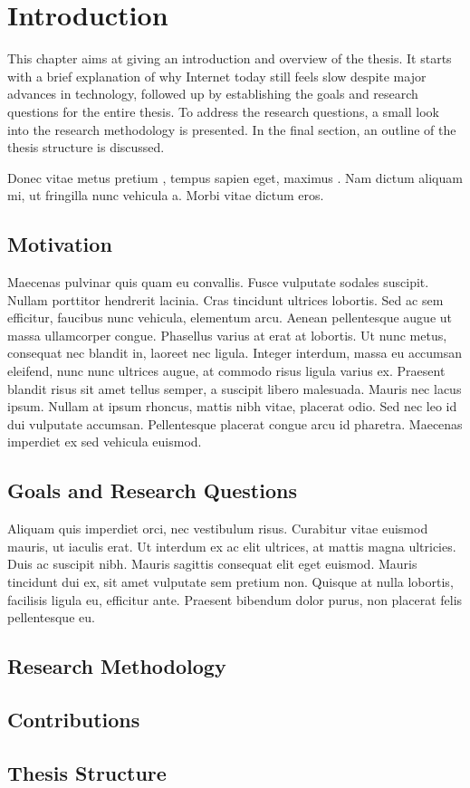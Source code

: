\chapter{Introduction}

This chapter aims at giving an introduction and overview of the thesis. It starts with a brief explanation of why Internet today still feels slow despite major advances in technology, followed up by establishing the goals and research questions for the entire thesis. To address the research questions, a small look into the research methodology is presented. In the final section, an outline of the thesis structure is discussed.

Donec vitae metus pretium \cite{abe}, tempus sapien eget, maximus . Nam dictum aliquam mi, ut fringilla nunc vehicula a. Morbi vitae dictum eros.

\section{Motivation}



Maecenas pulvinar quis quam eu convallis. Fusce vulputate sodales suscipit. Nullam porttitor hendrerit lacinia. Cras tincidunt ultrices lobortis. Sed ac sem efficitur, faucibus nunc vehicula, elementum arcu. Aenean pellentesque augue ut massa ullamcorper congue. Phasellus varius at erat at lobortis. Ut nunc metus, consequat nec blandit in, laoreet nec ligula. Integer interdum, massa eu accumsan eleifend, nunc nunc ultrices augue, at commodo risus ligula varius ex. Praesent blandit risus sit amet tellus semper, a suscipit libero malesuada. Mauris nec lacus ipsum. Nullam at ipsum rhoncus, mattis nibh vitae, placerat odio. Sed nec leo id dui vulputate accumsan. Pellentesque placerat congue arcu id pharetra. Maecenas imperdiet ex sed vehicula euismod.

\section{Goals and Research Questions}

Aliquam quis imperdiet orci, nec vestibulum risus. Curabitur vitae euismod mauris, ut iaculis erat. Ut interdum ex ac elit ultrices, at mattis magna ultricies. Duis ac suscipit nibh. Mauris sagittis consequat elit eget euismod. Mauris tincidunt dui ex, sit amet vulputate sem pretium non. Quisque at nulla lobortis, facilisis ligula eu, efficitur ante. Praesent bibendum dolor purus, non placerat felis pellentesque eu.

\section{Research Methodology}

\section{Contributions}

\section{Thesis Structure}